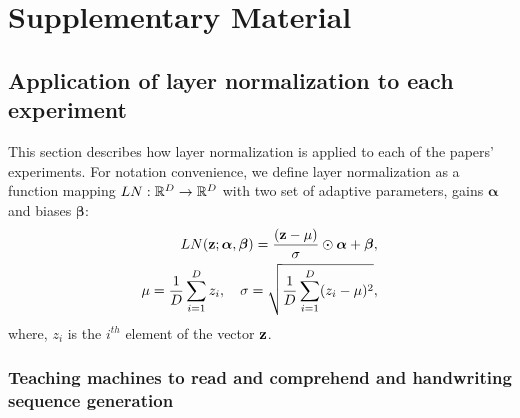 \documentclass{article}
\begin{document}
\section*{Supplementary Material}

\subsection*{Application of layer normalization to each experiment}

This section describes how layer normalization is applied to each of the papers' experiments. For notation convenience, we define layer normalization as a function mapping $LN: \mathbb{R}^D \to \mathbb{R}^D$ with two set of adaptive parameters, gains $\bm{\alpha}$ and biases $\bm{\beta}$:
\begin{eqnarray}
LN({\bf z} ; \bm{\alpha}, \bm{\beta}) = \frac{({\bf z} - \mu)}{\sigma} \odot \bm{\alpha} + \bm{\beta}, \\
\mu = \frac{1}{D}\sum_{i=1}^D z_i, \quad \sigma = \sqrt{\frac{1}{D}\sum_{i=1}^D (z_i-\mu)^2}, 
\end{eqnarray}
where, $z_i$ is the $i^{th}$ element of the vector ${\bf z}$.

\subsubsection*{Teaching machines to read and comprehend and handwriting sequence generation}
\end{document}
